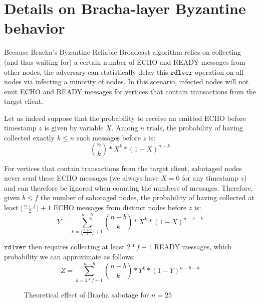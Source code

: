 
\section{Details on Bracha-layer Byzantine behavior\label{anx:detail_bracha_layer_attack}}



Because Bracha's Byzantine Reliable Broadcast algorithm \cite{asynchronous_byzantine_agreement_protocols} relies on collecting (and thus waiting for) a certain number of ECHO and READY messages from other nodes, the adversary can statistically delay this $\mathtt{rdlver}$ operation on all nodes via infecting a minority of nodes.
In this scenario, infected nodes will not emit ECHO and READY messages for vertices that contain transactions from the target client.

Let us indeed suppose that the probability to receive an emitted ECHO before timestamp $z$ is given by variable $X$.
Among $n$ trials, the probability of having collected exactly $k \leq n$ such messages before $z$ is:
\[
\binom{n}{k} * X^k * (1-X)^{n - k}
\]

For vertices that contain transactions from the target client, sabotaged nodes never send these ECHO messages (we always have $X=0$ for any timestamp $z$) and can therefore be ignored when counting the numbers of messages.
Therefore, given $b \leq f$ the number of sabotaged nodes, the probability of having collected at least $\lfloor \frac{n+f}{2} \rfloor + 1$ ECHO messages from distinct nodes before $z$ is:
\[
Y = \sum_{k = \lfloor \frac{n+f}{2} \rfloor + 1}^{n-b} \binom{n - b}{k} * X^k * (1-X)^{n - b - k}
\]


$\mathtt{rdlver}$ then requires collecting at least $2*f+1$ READY messages, which probability we can approximate as follows:
\[
Z = \sum_{k = 2*f + 1}^{n-b} \binom{n - b}{k} * Y^k * (1-Y)^{n - b - k}
\]



\begin{figure}[h!]
\vspace*{-.25cm}
    \centering

\scalebox{.85}{

}

    \caption{Theoretical effect of Bracha sabotage for $n=25$}
    \label{fig:bracha_sabotage_theory}
\vspace*{-.25cm}
\end{figure}


